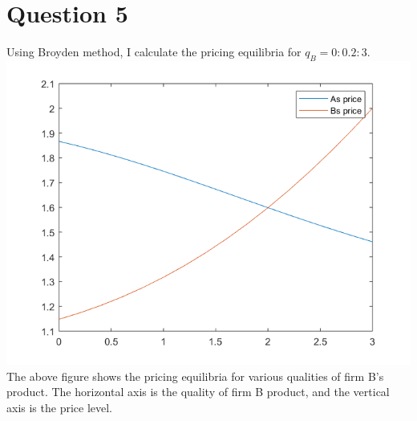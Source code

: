\documentclass[12pt]{article}
\begin{document}
\section{Question 5}
Using Broyden method, I calculate the pricing equilibria for $q_{B}=0:0.2:3$.\\
\includegraphics{price.png}\\
The above figure shows the pricing equilibria for various qualities of firm B's product. The horizontal axis is the quality of firm B product, and the vertical axis is the price level. 
\end{document}
